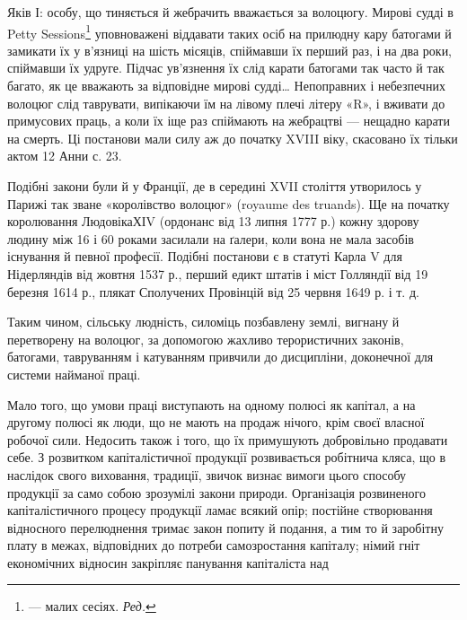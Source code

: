 Яків І: особу, що тиняється й жебрачить вважається за волоцюгу.
Мирові судді в Petty Sessions\footnote*{
— малих сесіях. \emph{Ред.}
} уповноважені віддавати
таких осіб на прилюдну кару батогами й замикати їх у в’язниці
на шість місяців, спіймавши їх перший раз, і на два роки, спіймавши
їх удруге. Підчас ув’язнення їх слід карати батогами так часто
й так багато, як це вважають за відповідне мирові судді\dots{} Непоправних
і небезпечних волоцюг слід таврувати, випікаючи
їм на лівому плечі літеру «R», і вживати до примусових праць,
а коли їх іще раз спіймають на жебрацтві — нещадно карати
на смерть. Ці постанови мали силу аж до початку XVIII віку,
скасовано їх тільки актом 12 Анни с. 23.

Подібні закони були й у Франції, де в середині XVII століття
утворилось у Парижі так зване «королівство волоцюг»
(royaume des truands). Ще на початку королювання ЛюдовікаХІV
(ордонанс від 13 липня 1777 р.) кожну здорову людину між 16 і
60 роками засилали на ґалери, коли вона не мала засобів існування
й певної професії. Подібні постанови є в статуті Карла V
для Нідерляндів від жовтня 1537 р., перший едикт штатів і міст
Голляндії від 19 березня 1614 р., плякат Сполучених Провінцій
від 25 червня 1649 р. і т. д.

Таким чином, сільську людність, силоміць позбавлену землі,
вигнану й перетворену на волоцюг, за допомогою жахливо терористичних
законів, батогами, тавруванням і катуванням привчили
до дисципліни, доконечної для системи найманої праці.

Мало того, що умови праці виступають на одному полюсі як
капітал, а на другому полюсі як люди, що не мають на продаж
нічого, крім своєї власної робочої сили. Недосить також і того,
що їх примушують добровільно продавати себе. З розвитком капіталістичної
продукції розвивається робітнича кляса, що в наслідок
свого виховання, традиції, звичок визнає вимоги цього способу
продукції за само собою зрозумілі закони природи. Організація
розвиненого капіталістичного процесу продукції ламає
всякий опір; постійне створювання відносного перелюднення
тримає закон попиту й подання, а тим то й заробітну плату
в межах, відповідних до потреби самозростання капіталу; німий
гніт економічних відносин закріпляє панування капіталіста над
\parbreak{}  %
